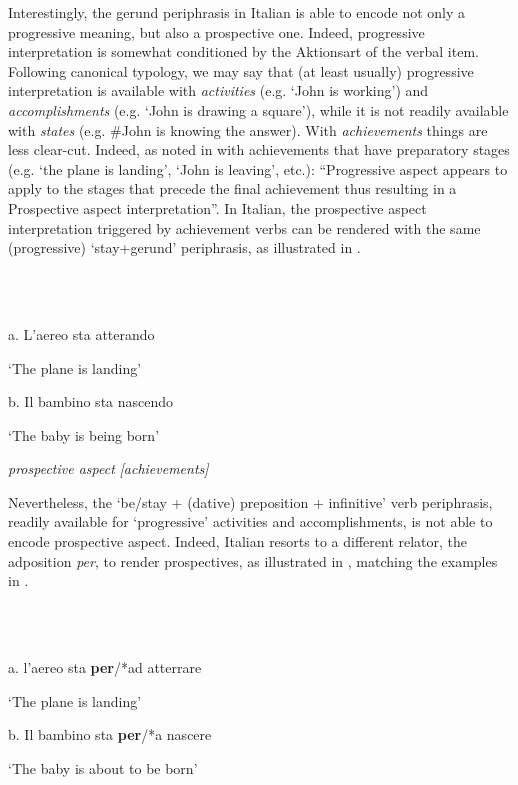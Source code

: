 \documentclass[output=paper,colorlinks,citecolor=brown]{./langscibook}
\begin{document}
Interestingly, the gerund periphrasis in Italian is able to encode not only a progressive meaning, but also a prospective one. Indeed, progressive interpretation is somewhat conditioned by the Aktionsart of the verbal item. Following  canonical typology, we may say that (at least usually) progressive interpretation is available with \textit{activities} (e.g. ‘John is working’) and \textit{accomplishments} (e.g. ‘John is drawing a square’), while it is not readily available with \textit{states} (e.g. \#John is knowing the answer). With \textit{achievements} things are less clear-cut. Indeed, as noted in \citet[538]{Cinque2017} with achievements that have preparatory stages (e.g. ‘the plane is landing’, ‘John is leaving’, etc.): “Progressive aspect appears to apply to the stages that precede the final achievement thus resulting in a Prospective aspect interpretation”. In Italian, the prospective aspect interpretation triggered by achievement verbs can be rendered with the same (progressive) ‘stay+gerund’ periphrasis, as illustrated in .

\ea%
    \label{ex:key:22}
    \gll\\
        \\
    \glt
    \z

          a.  L’aereo sta atterando     

    ‘The plane is landing’      

b.  Il bambino sta nascendo  

  ‘The baby is being born’

\textit{prospective aspect}   \textit{[achievements]}

Nevertheless, the ‘be/stay + (dative) preposition + infinitive’ verb periphrasis, readily available for ‘progressive’ activities and accomplishments, is not able to encode prospective aspect. Indeed, Italian resorts to a different relator, the adposition \textit{per}, to render prospectives, as illustrated in , matching the examples in .

\ea%
    \label{ex:key:23}
    \gll\\
        \\
    \glt
    \z

          a.  l’aereo sta \textbf{per}/*ad atterrare

    ‘The plane is landing’  

b.  Il bambino sta \textbf{per}/*a nascere

  ‘The baby is about to be born’
\end{document}
